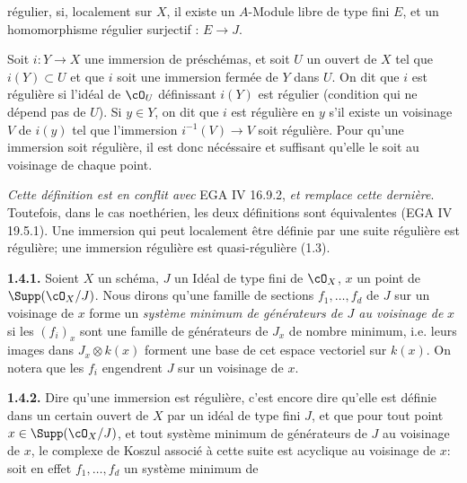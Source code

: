 régulier, si, localement sur $X$, il existe un $A$-Module libre de type fini $E$, et un homomorphisme régulier surjectif : $E\longrightarrow J$.

Soit $i:Y\longrightarrow X$ une immersion de préschémas, et soit $U$ un ouvert de $X$ tel que $i(Y)\subset U$ et que $i$ soit une immersion fermée de $Y$ dans $U$. On dit que $i$ est régulière si l'idéal de $\cO_U$ définissant $i(Y)$ est régulier (condition qui ne dépend pas de $U$). Si $y\in Y$, on dit que $i$ est régulière en $y$ s'il existe un voisinage $V$ de $i(y)$ tel que l'immersion $i^{-1}(V)\longrightarrow V$ soit régulière. Pour qu'une immersion soit régulière, il est donc nécéssaire et suffisant qu'elle le soit au voisinage de chaque point.

\emph{Cette définition est en conflit avec} EGA IV 16.9.2, \emph{et remplace cette dernière}. Toutefois, dans le cas noethérien, les deux définitions sont équivalentes (EGA IV 19.5.1). Une immersion qui peut localement être définie par une suite régulière est régulière; une immersion régulière est quasi-régulière (1.3).

\textbf{1.4.1.} Soient $X$ un schéma, $J$ un Idéal de type fini de $\cO_X$, $x$ un point de $\Supp(\cO_X/J)$. Nous dirons qu'une famille de sections $f_1,\ldots,f_d$ de $J$ sur un voisinage de $x$ forme un \emph{système minimum de générateurs de $J$ au voisinage de} $x$ si les $(f_i)_x$ sont une famille de générateurs de $J_x$ de nombre minimum, i.e. leurs images dans $J_x\otimes k(x)$ forment une base de cet espace vectoriel sur $k(x)$. On notera que les $f_i$ engendrent $J$ sur un voisinage de $x$.

\textbf{1.4.2.} Dire qu'une immersion est régulière, c'est encore dire qu'elle est définie dans un certain ouvert de $X$ par un idéal de type fini $J$, et que pour tout point $x\in\Supp(\cO_X/J)$, et tout système minimum de générateurs de $J$ au voisinage de $x$, le complexe de Koszul associé à cette suite est acyclique au voisinage de $x$: soit en effet $f_1,\ldots,f_d$ un système minimum de
